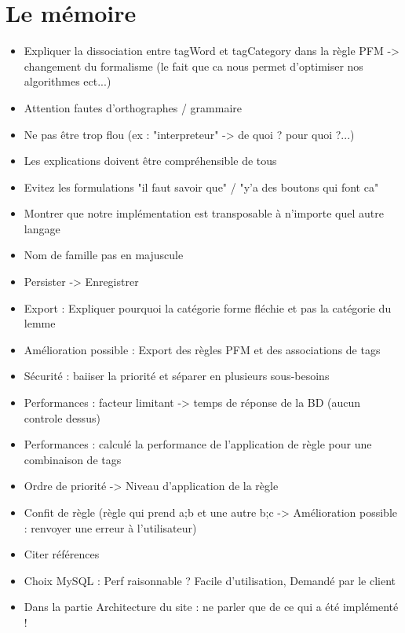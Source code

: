 \documentclass{article}
\begin{document}
\section{Le mémoire}
\begin{itemize}
    \item Expliquer la dissociation entre tagWord et tagCategory dans la règle PFM -> changement du formalisme (le fait que ca nous permet d'optimiser nos algorithmes ect...)
    \item Attention fautes d'orthographes / grammaire
    \item Ne pas être trop flou (ex : "interpreteur" -> de quoi ? pour quoi ?...)
    \item Les explications doivent être compréhensible de tous
    \item Evitez les formulations "il faut savoir que" / "y'a des boutons qui font ca"
    \item Montrer que notre implémentation est transposable à n'importe quel autre langage
    \item Nom de famille pas en majuscule
    \item Persister -> Enregistrer
    \item Export : Expliquer pourquoi la catégorie forme fléchie et pas la catégorie du lemme
    \item Amélioration possible : Export des règles PFM et des associations de tags
    \item Sécurité : baiiser la priorité et séparer en plusieurs sous-besoins
    \item Performances : facteur limitant -> temps de réponse de la BD (aucun controle dessus)
    \item Performances : calculé la performance de l'application de règle pour une combinaison de tags
    \item Ordre de priorité -> Niveau d'application de la règle
    \item Confit de règle (règle qui prend a;b et une autre b;c -> Amélioration possible : renvoyer une erreur à l'utilisateur)
    \item Citer références
    \item Choix MySQL : Perf raisonnable ? Facile d'utilisation, Demandé par le client
    \item Dans la partie Architecture du site : ne parler que de ce qui a été implémenté !
\end{itemize}
\end{document}

